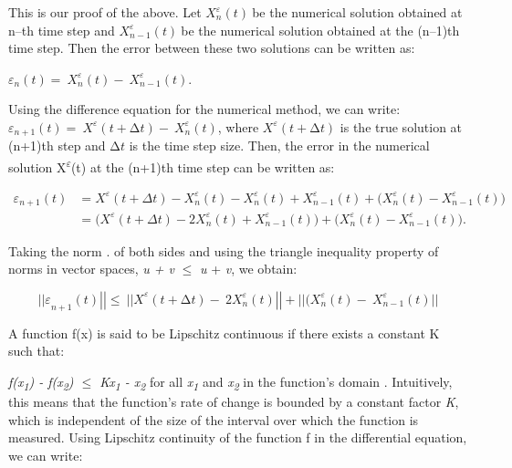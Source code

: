 \documentclass[12pt,a4paper]{report}
\numberwithin{equation}{section}
\begin{document}
This is our proof of the above. Let \(X_{n}^{\varepsilon}(t)\ \)be the
numerical solution obtained at n--th time step and
\(X_{n - 1}^{\varepsilon}(t)\ \)be the numerical solution obtained at
the (n--1)th time step. Then the error between these two solutions can be
written as:

\(\varepsilon_{n}(t) = \ X_{n}^{\varepsilon}(t) - \ X_{n - 1}^{\varepsilon}(t)\).

Using the difference equation for the numerical method, we can write:
\(\varepsilon_{n + 1}(t) = \ X^{\varepsilon}(t + \mathrm{\Delta}t) - \ X_{n}^{\varepsilon}(t)\),
where \(X^{\varepsilon}(t + \mathrm{\Delta}t)\) is the true solution at
(n+1)th step and \(\mathrm{\Delta}t\) is the time step size. Then, the
error in the numerical solution X\textsuperscript{$\varepsilon$}(t) at the (n+1)th
time step can be written as:

\[
\begin{aligned}
\varepsilon_{n+1}(t)
&= X^{\varepsilon}(t+\Delta t)-X_{n}^{\varepsilon}(t)
      -X_{n}^{\varepsilon}(t)+X_{n-1}^{\varepsilon}(t)
      +\bigl(X_{n}^{\varepsilon}(t)-X_{n-1}^{\varepsilon}(t)\bigr) \\
&= \bigl(X^{\varepsilon}(t+\Delta t)-2X_{n}^{\varepsilon}(t)+X_{n-1}^{\varepsilon}(t)\bigr)
   +\bigl(X_{n}^{\varepsilon}(t)-X_{n-1}^{\varepsilon}(t)\bigr).
\end{aligned}
\]


Taking the norm \textbar\textbar.\textbar\textbar{} of both sides and
using the triangle inequality property of norms in vector spaces,
\textbar\textbar{}\emph{u + v}\textbar\textbar{} $\leq$
\textbar\textbar{}\emph{u}\textbar\textbar{} +
\textbar\textbar{}\emph{v}\textbar, we obtain:

\[{||\varepsilon}_{n + 1}(t)\left| \left| \leq \ {||X}^{\varepsilon}(t + \mathrm{\Delta}t) - \ 2X_{n}^{\varepsilon}(t) \right| \right| + ||(X_{n}^{\varepsilon}(t) - \ X_{n - 1}^{\varepsilon}(t)||\]

A function f(x) is said to be Lipschitz continuous if there exists a
constant K such that:

\textbar{}\emph{f(x\textsubscript{1}) - f(x\textsubscript{2})\textbar{}
$\leq$ K\textbar x\textsubscript{1} - x\textsubscript{2}}\textbar{} for all
\emph{x\textsubscript{1}} and \emph{x\textsubscript{2}} in the
function's domain \cite{llendeto2007modeling_82}. Intuitively, this means that the function's
rate of change is bounded by a constant factor \emph{K}, which is
independent of the size of the interval over which the function is
measured. Using Lipschitz continuity of the function f in the
differential equation, we can write:
\end{document}
